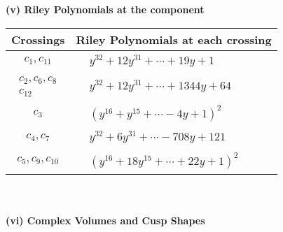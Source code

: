 \documentclass[1p]{elsarticle_modified}
\theoremstyle{definition}
\begin{document}
\flushleft \textbf{(v) Riley Polynomials at the component}\newline \\
\begin{tabular}{m{50pt}|m{274pt}}
Crossings & \hspace{64pt}Riley Polynomials at each crossing \\
\hline $$\begin{aligned}c_{1},c_{11}\end{aligned}$$&$\begin{aligned}
&y^{32}+12 y^{31}+\cdots+19 y+1
\end{aligned}$\\
\hline $$\begin{aligned}c_{2},c_{6},c_{8}\\c_{12}\end{aligned}$$&$\begin{aligned}
&y^{32}+12 y^{31}+\cdots+1344 y+64
\end{aligned}$\\
\hline $$\begin{aligned}c_{3}\end{aligned}$$&$\begin{aligned}
&(y^{16}+y^{15}+\cdots-4 y+1)^{2}
\end{aligned}$\\
\hline $$\begin{aligned}c_{4},c_{7}\end{aligned}$$&$\begin{aligned}
&y^{32}+6 y^{31}+\cdots-708 y+121
\end{aligned}$\\
\hline $$\begin{aligned}c_{5},c_{9},c_{10}\end{aligned}$$&$\begin{aligned}
&(y^{16}+18 y^{15}+\cdots+22 y+1)^{2}
\end{aligned}$\\
\hline
\end{tabular}\\~\\
\newpage\flushleft \textbf{(vi) Complex Volumes and Cusp Shapes}
\end{document}
